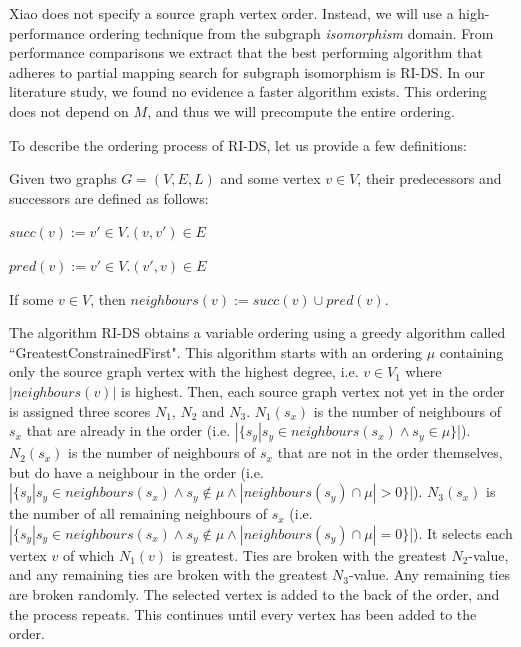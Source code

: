 Xiao does not specify a source graph vertex order. Instead, we will use a high-performance ordering technique from the subgraph \textit{isomorphism} domain. From performance comparisons we extract that the best performing algorithm that adheres to partial mapping search for subgraph isomorphism is RI-DS. In our literature study, we found no evidence a faster algorithm exists. This ordering does not depend on $M$, and thus we will precompute the entire ordering.

To describe the ordering process of RI-DS, let us provide a few definitions:

\begin{defn}
Given two graphs $G=(V, E, L)$ and some vertex $v \in V$, their predecessors and successors are defined as follows:

$\mathit{succ}(v) := {v' \in V . (v, v') \in E}$

$\mathit{pred}(v) := {v' \in V . (v', v) \in E}$
 
\end{defn}

\begin{defn}
If some $v\in V$, then $\mathit{neighbours}(v):= \mathit{succ}(v) \cup \mathit{pred}(v)$.
\end{defn}



The algorithm RI-DS obtains a variable ordering using a greedy algorithm called ``GreatestConstrainedFirst". This algorithm starts with an ordering $\mu$ containing only the source graph vertex with the highest degree, i.e. $v\in V_1$ where $|\mathit{neighbours}(v)|$ is highest. Then, each source graph vertex not yet in the order is assigned three scores $N_1$, $N_2$ and $N_3$. $N_1(s_x)$ is the number of neighbours of $s_x$ that are already in the order (i.e. $|\{s_y | s_y \in \mathit{neighbours}(s_x) \land s_y \in \mu\}$|). $N_2(s_x)$ is the number of neighbours of $s_x$ that are not in the order themselves, but do have a neighbour in the order (i.e. $|\{s_y | s_y \in \mathit{neighbours}(s_x) \land s_y \not \in \mu \land |\mathit{neighbours}(s_y) \cap \mu| > 0\}$|). $N_3(s_x)$ is the number of all remaining neighbours of $s_x$ (i.e. $|\{s_y | s_y \in \mathit{neighbours}(s_x) \land s_y \not \in \mu \land |\mathit{neighbours}(s_y) \cap \mu| = 0\}$|). It selects each vertex $v$ of which $N_1(v)$ is greatest. Ties are broken with the greatest $N_2$-value, and any remaining ties are broken with the greatest $N_3$-value. Any remaining ties are broken randomly. The selected vertex is added to the back of the order, and the process repeats. This continues until every vertex has been added to the order.

